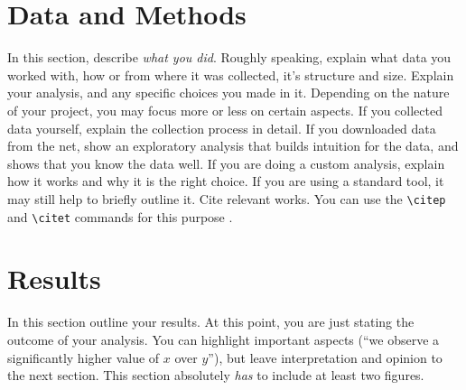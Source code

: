 \documentclass{article}
\begin{document}
\section{Data and Methods}\label{sec:methods}

In this section, describe \emph{what you did}. Roughly speaking, explain what data you worked with, how or from where it was collected, it's structure and size. Explain your analysis, and any specific choices you made in it. Depending on the nature of your project, you may focus more or less on certain aspects. If you collected data yourself, explain the collection process in detail. If you downloaded data from the net, show an exploratory analysis that builds intuition for the data, and shows that you know the data well. If you are doing a custom analysis, explain how it works and why it is the right choice. If you are using a standard tool, it may still help to briefly outline it. Cite relevant works. You can use the \verb|\citep| and \verb|\citet| commands for this purpose \citep{mackay2003information}.

% 

\section{Results}\label{sec:results}

In this section outline your results. At this point, you are just stating the outcome of your analysis. You can highlight important aspects (``we observe a significantly higher value of $x$ over $y$''), but leave interpretation and opinion to the next section. This section absolutely \emph{has} to include at least two figures.
\end{document}
